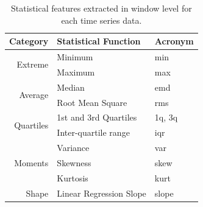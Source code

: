 \begin{table}[h]
\centering
\begin{tabular}{r|l|l}
\hline
Category                   & Statistical Function & \multicolumn{1}{l}{Acronym} \\ \hline\hline
\multirow{2}{*}{Extreme}   & Minimum                 & min                          \\ \cline{3-3} 
                           & Maximum                 & max                          \\ \hline
\multirow{2}{*}{Average}   & Median                  & emd                          \\ \cline{3-3} 
                           & Root Mean Square        & rms                          \\ \hline
\multirow{2}{*}{Quartiles} & 1st and 3rd Quartiles   & 1q, 3q                       \\ \cline{3-3} 
                           & Inter-quartile range    & iqr                          \\ \hline
\multirow{3}{*}{Moments}   & Variance                & var                          \\ \cline{3-3} 
                           & Skewness                & skew                         \\ \cline{3-3} 
                           & Kurtosis                & kurt                         \\ \hline
Shape                      & Linear Regression Slope & slope                        \\ \hline
\end{tabular}
\caption{Statistical features extracted in window level for each time series data.}
\label{table:fd}
\end{table}


